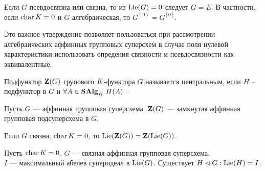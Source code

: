 \begin{subsection}{}
  \begin{lemma}
    Если $ G $ псевдосвязна или связна, то из $ \mathrm{Lie}(G) = 0 $ следует $ G = E $.
    В частности, если $ \mathop{\mathrm{char}}K = 0 $ и $ G $ алгебраическая, то $ G^{(0)} = G^{[0]} $.
  \end{lemma}

  Это важное утверждение позволяет пользоваться при рассмотрении
  алгебраических аффинных групповых суперсхем в случае поля нулевой характеристики
  использовать опредения связности и псевдосвязности как эквивалентные.

\end{subsection}


\begin{subsection}{}
  \begin{definition}
    Подфунктор $ \mathbf{Z}(G) $ групового $ K $-функтора $ G $ называется центральным,
    если $ H $ -- подфунктор в $ G $ и $ \forall A \in \mathbf{SAlg}_K \; H(A) $ --
  \end{definition}


  \begin{proposition} \label{Z(G) closed in G}
    Пусть $ G $ --- аффинная групповая суперсхема.
    $ \mathbf{Z}(G) $ --- замкнутая аффинная групповая подсуперсхема в $ G $.
    \proof {

      \qedhere
    }
  \end{proposition}

  \begin{proposition} \label{Lie(Z(G)) = Z(Lie(G))}
    Если $ G $ связна, $ \mathop{\mathrm{char}} K = 0 $, то $ \mathrm{Lie}(\mathbf{Z}(G)) = \mathbf{Z}(\mathrm{Lie}(G)) $.
    \proof {

      \qedhere
    }
  \end{proposition}

  \begin{theorem} \label{Exists H in G: Lie(H) = I}
    Пусть $ \mathop{\mathrm{char}} K = 0 $, $ G $ --- связная аффинная групповая суперсхема, \\
    $ I $ --- максимальный абелев суперидеал в $ \mathrm{Lie}(G) $.
    Существует $ H \lhd G : \mathrm{Lie}(H) = I $.
\end{theorem}
\end{subsection}
